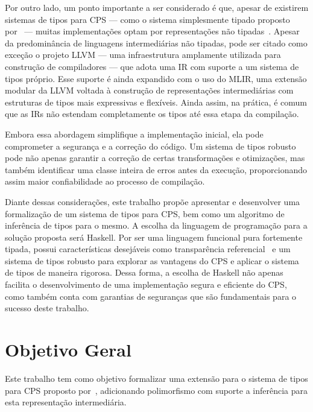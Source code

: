 Por outro lado, um ponto importante a ser considerado é que, apesar de existirem sistemas de tipos para CPS {---} como o sistema simplesmente tipado proposto por~ {---} muitas implementações optam por representações não tipadas~\cite{morrisett1999systemF,torrens2024operational}.
Apesar da predominância de linguagens intermediárias não tipadas, pode ser citado como exceção o projeto LLVM {---} uma infraestrutura amplamente utilizada para construção de compiladores {---} que adota uma IR com suporte a um sistema de tipos próprio.
Esse suporte é ainda expandido com o uso do MLIR, uma extensão modular da LLVM voltada à construção de representações intermediárias com estruturas de tipos mais expressivas e flexíveis.
Ainda assim, na prática, é comum que as IRs não estendam completamente os tipos até essa etapa da compilação.

Embora essa abordagem simplifique a implementação inicial, ela pode comprometer a segurança e a correção do código.
Um sistema de tipos robusto pode não apenas garantir a correção de certas transformações e otimizações, mas também identificar uma classe inteira de erros antes da execução, proporcionando assim maior confiabilidade ao processo de compilação.

Diante dessas considerações, este trabalho propõe apresentar e desenvolver uma formalização de um sistema de tipos para CPS, bem como um algoritmo de inferência de tipos para o mesmo.
A escolha da linguagem de programação para a solução proposta será Haskell.
Por ser uma linguagem funcional pura fortemente tipada, possui características desejáveis como transparência referencial~\cite{sondergaard1990transparency} e um sistema de tipos robusto para explorar as vantagens do CPS e aplicar o sistema de tipos de maneira rigorosa.
Dessa forma, a escolha de Haskell não apenas facilita o desenvolvimento de uma implementação segura e eficiente do CPS, como também conta com garantias de seguranças que são fundamentais para o sucesso deste trabalho.

\section{Objetivo Geral}\label{sec:objetivo-geral}

Este trabalho tem como objetivo formalizar uma extensão para o sistema de tipos para CPS proposto por~, adicionando polimorfismo com suporte a inferência para esta representação intermediária.

